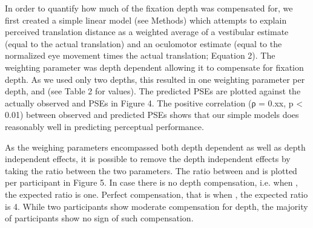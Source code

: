 In order to quantify how much of the fixation depth was compensated for, we first created a simple linear model (see Methods) which attempts to explain perceived translation distance as a weighted average of a vestibular estimate (equal to the actual translation) and an oculomotor estimate (equal to the normalized eye movement times the actual translation; Equation 2).  The weighting parameter was depth dependent allowing it to compensate for fixation depth. As we used only two depths, this resulted in one weighting parameter per depth,  and  (see Table 2 for values). The predicted PSEs are plotted against the actually observed and PSEs in Figure 4. The positive correlation (ρ = 0.xx, p < 0.01) between observed and predicted PSEs shows that our simple models does reasonably well in predicting perceptual performance.

As the weighing parameters encompassed both depth dependent as well as depth independent effects, it is possible to remove the depth independent effects by taking the ratio between the two parameters. The ratio between  and  is plotted per participant in Figure 5. In case there is no depth compensation, i.e. when , the expected ratio is one. Perfect compensation, that is when , the expected ratio is 4. While two participants show moderate compensation for depth, the majority of participants show no sign of such compensation.
